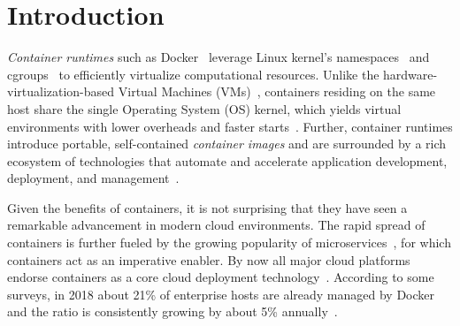 \section{Introduction}
\label{sec:intro}

%
%
%
%
%
%
%



\emph{Container runtimes} such as Docker~\cite{docker} 
leverage Linux kernel's namespaces~\cite{namespaces} and cgroups~\cite{cgroups}
to efficiently virtualize computational resources.
%
Unlike the hardware-virtualization-based Virtual Machines
(VMs)~\cite{adams2006comparison}, containers residing on the same host share
the single Operating System (OS) kernel, which yields virtual environments with
lower overheads and faster starts~\cite{7819678}.
%
Further, container runtimes introduce portable, self-contained \emph{container
images} and are surrounded by a rich ecosystem of technologies that automate
and accelerate application development, deployment, and
management~\cite{cncfprojects}.

Given the benefits of containers, it is not surprising that they have seen a
remarkable advancement in modern cloud environments.
%
The rapid spread of containers is further fueled by the growing popularity of
microservices~\cite{wolff2016microservices},
for which containers act as an imperative enabler.
%
By now all major cloud platforms endorse containers as a core cloud deployment
technology~\cite{googlecengine,azurec,ibmkube,awscont}.
%
According to some surveys, in 2018 about 21\% of enterprise hosts are already
managed by Docker and the ratio is consistently growing by about 5\%
annually~\cite{20percentdocker}.


